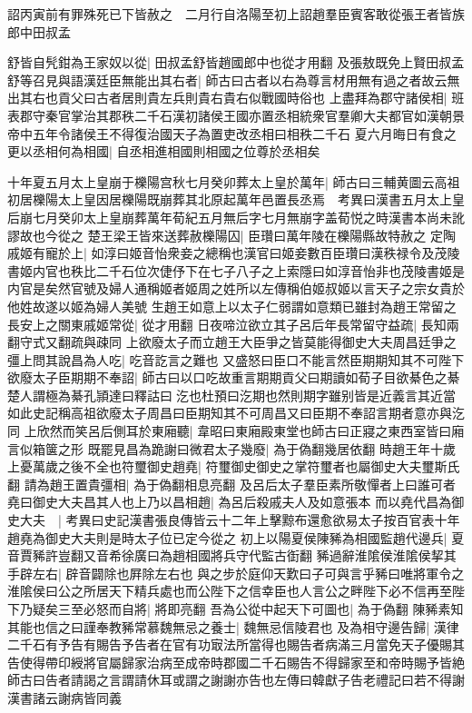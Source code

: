詔丙寅前有罪殊死已下皆赦之　二月行自洛陽至初上詔趙羣臣賓客敢從張王者皆族郎中田叔孟

舒皆自髠鉗為王家奴以從|{
	田叔孟舒皆趙國郎中也從才用翻}
及張敖既免上賢田叔孟舒等召見與語漢廷臣無能出其右者|{
	師古曰古者以右為尊言材用無有過之者故云無出其右也貢父曰古者居則貴左兵則貴右貴右似戰國時俗也}
上盡拜為郡守諸侯相|{
	班表郡守秦官掌治其郡秩二千石漢初諸侯王國亦置丞相統衆官羣卿大夫都官如漢朝景帝中五年令諸侯王不得復治國天子為置吏改丞相曰相秩二千石}
夏六月晦日有食之　更以丞相何為相國|{
	自丞相進相國則相國之位尊於丞相矣}


十年夏五月太上皇崩于櫟陽宫秋七月癸卯葬太上皇於萬年|{
	師古曰三輔黄圖云高祖初居櫟陽太上皇因居櫟陽既崩葬其北原起萬年邑置長丞焉　考異曰漢書五月太上皇后崩七月癸卯太上皇崩葬萬年荀紀五月無后字七月無崩字盖荀悦之時漢書本尚未訛謬故也今從之}
楚王梁王皆來送葬赦櫟陽囚|{
	臣瓚曰萬年陵在櫟陽縣故特赦之}
定陶戚姬有寵於上|{
	如淳曰姬音怡衆妾之總稱也漢官曰姬妾數百臣瓚曰漢秩禄令及茂陵書姬内官也秩比二千石位次倢伃下在七子八子之上索隱曰如淳音怡非也茂陵書姬是内官是矣然官號及婦人通稱姬者姬周之姓所以左傳稱伯姬叔姬以言天子之宗女貴於他姓故遂以姬為婦人美號}
生趙王如意上以太子仁弱謂如意類已雖封為趙王常留之長安上之關東戚姬常從|{
	從才用翻}
日夜啼泣欲立其子呂后年長常留守益疏|{
	長知兩翻守式又翻疏與疎同}
上欲廢太子而立趙王大臣爭之皆莫能得御史大夫周昌廷爭之彊上問其說昌為人吃|{
	吃音訖言之難也}
又盛怒曰臣口不能言然臣期期知其不可陛下欲廢太子臣期期不奉詔|{
	師古曰以口吃故重言期期貢父曰期讀如荀子目欲綦色之綦楚人謂極為綦孔頴達曰釋詁曰汔也杜預曰汔期也然則期字雖别皆是近義言其近當如此史記稱高祖欲廢太子周昌曰臣期知其不可周昌又曰臣期不奉詔言期者意亦與汔同}
上欣然而笑呂后側耳於東廂聽|{
	韋昭曰東廂殿東堂也師古曰正寢之東西室皆曰廂言似箱箧之形}
既罷見昌為跪謝曰微君太子幾廢|{
	為于偽翻幾居依翻}
時趙王年十歲上憂萬歲之後不全也符璽御史趙堯|{
	符璽御史御史之掌符璽者也屬御史大夫璽斯氏翻}
請為趙王置貴彊相|{
	為于偽翻相息亮翻}
及呂后太子羣臣素所敬憚者上曰誰可者堯曰御史大夫昌其人也上乃以昌相趙|{
	為呂后殺戚夫人及如意張本}
而以堯代昌為御史大夫　|{
	考異曰史記漢書張良傳皆云十二年上擊黥布還愈欲易太子按百官表十年趙堯為御史大夫則是時太子位已定今從之}
初上以陽夏侯陳豨為相國監趙代邊兵|{
	夏音賈豨許豈翻又音希徐廣曰為趙相國將兵守代監古衘翻}
豨過辭淮隂侯淮隂侯挈其手辟左右|{
	辟音闢除也屛除左右也}
與之步於庭仰天歎曰子可與言乎豨曰唯將軍令之淮隂侯曰公之所居天下精兵處也而公陛下之信幸臣也人言公之畔陛下必不信再至陛下乃疑矣三至必怒而自將|{
	將即亮翻}
吾為公從中起天下可圖也|{
	為于偽翻}
陳豨素知其能也信之曰謹奉教豨常慕魏無忌之養士|{
	魏無忌信陵君也}
及為相守邊告歸|{
	漢律二千石有予告有賜告予告者在官有功㝡法所當得也賜告者病滿三月當免天子優賜其告使得帶印綬將官屬歸家治病至成帝時郡國二千石賜告不得歸家至和帝時賜予皆絶師古曰告者請謁之言謂請休耳或謂之謝謝亦告也左傳曰韓獻子告老禮記曰若不得謝漢書諸云謝病皆同義}
